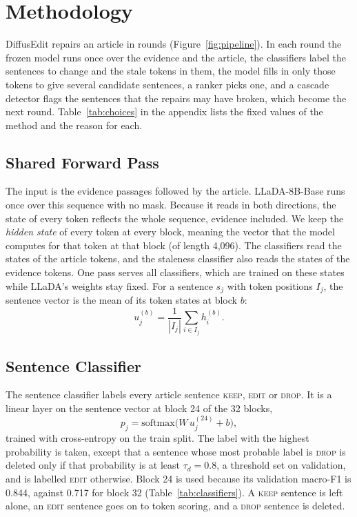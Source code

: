 \documentclass[11pt]{article}
\newcommand{\keep}{\textsc{keep}}
\newcommand{\edit}{\textsc{edit}}
\newcommand{\drop}{\textsc{drop}}
\begin{document}
\section{Methodology}
\label{sec:method}

DiffusEdit repairs an article in rounds (Figure~\ref{fig:pipeline}). In each round the frozen model runs once over the evidence and the article, the classifiers label the sentences to change and the stale tokens in them, the model fills in only those tokens to give several candidate sentences, a ranker picks one, and a cascade detector flags the sentences that the repairs may have broken, which become the next round. Table~\ref{tab:choices} in the appendix lists the fixed values of the method and the reason for each.

\subsection{Shared Forward Pass}
The input is the evidence passages followed by the article. LLaDA-8B-Base \citep{nie-etal-2025-llada} runs once over this sequence with no mask. Because it reads in both directions, the state of every token reflects the whole sequence, evidence included. We keep the \emph{hidden state} of every token at every block, meaning the vector that the model computes for that token at that block (of length 4,096). The classifiers read the states of the article tokens, and the staleness classifier also reads the states of the evidence tokens. One pass serves all classifiers, which are trained on these states while LLaDA's weights stay fixed. For a sentence $s_j$ with token positions $I_j$, the sentence vector is the mean of its token states at block $b$:
\begin{equation}
u_j^{(b)} = \frac{1}{|I_j|}\sum_{i \in I_j} h_i^{(b)}.
\end{equation}

\subsection{Sentence Classifier}
The sentence classifier labels every article sentence \keep{}, \edit{} or \drop{}. It is a linear layer on the sentence vector at block 24 of the 32 blocks,
\begin{equation}
p_j = \mathrm{softmax}\big(W\,u_j^{(24)} + b\big),
\end{equation}
trained with cross-entropy on the train split. The label with the highest probability is taken, except that a sentence whose most probable label is \drop{} is deleted only if that probability is at least $\tau_d = 0.8$, a threshold set on validation, and is labelled \edit{} otherwise. Block 24 is used because its validation macro-F1 is 0.844, against 0.717 for block 32 (Table~\ref{tab:classifiers}). A \keep{} sentence is left alone, an \edit{} sentence goes on to token scoring, and a \drop{} sentence is deleted.
\end{document}
